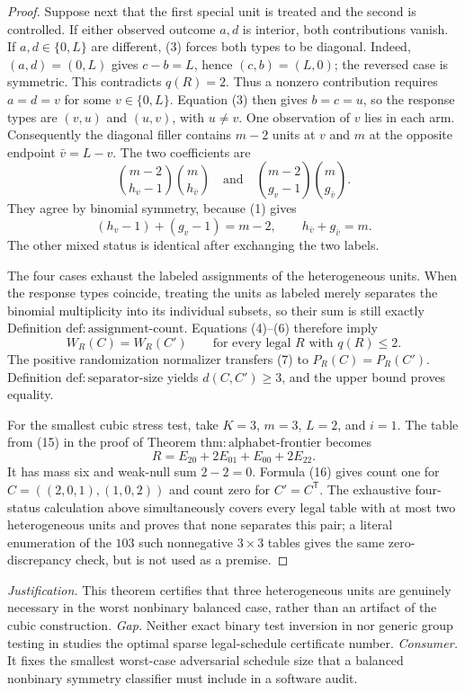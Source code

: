 \documentclass{article}
\begin{document}
\begin{proof}
Suppose next that the first special unit is treated and the second is controlled. If either observed outcome \(a,d\) is interior, both contributions vanish. If \(a,d\in\{0,L\}\) are different, (3) forces both types to be diagonal. Indeed, \((a,d)=(0,L)\) gives \(c-b=L\), hence \((c,b)=(L,0)\); the reversed case is symmetric. This contradicts \(q(R)=2\). Thus a nonzero contribution requires \(a=d=v\) for some \(v\in\{0,L\}\). Equation (3) then gives \(b=c=u\), so the response types are \((v,u)\) and \((u,v)\), with \(u\neq v\). One observation of \(v\) lies in each arm. Consequently the diagonal filler contains \(m-2\) units at \(v\) and \(m\) at the opposite endpoint \(\bar v=L-v\). The two coefficients are
\[
 \binom{m-2}{h_v-1}\binom m{h_{\bar v}}
 \quad\text{and}\quad
 \binom{m-2}{g_v-1}\binom m{g_{\bar v}}.
 \tag{6}
\]
They agree by binomial symmetry, because (1) gives
\[
 (h_v-1)+(g_v-1)=m-2,
 \qquad h_{\bar v}+g_{\bar v}=m.
\]
The other mixed status is identical after exchanging the two labels.

The four cases exhaust the labeled assignments of the heterogeneous units. When the response types coincide, treating the units as labeled merely separates the binomial multiplicity into its individual subsets, so their sum is still exactly Definition \(\mathrm{def{:}assignment\text{-}count}\). Equations (4)--(6) therefore imply
\[
 W_R(C)=W_R(C')
 \qquad\text{for every legal }R\text{ with }q(R)\leq2.
 \tag{7}
\]
The positive randomization normalizer transfers (7) to \(P_R(C)=P_R(C')\). Definition \(\mathrm{def{:}separator\text{-}size}\) yields \(d(C,C')\geq3\), and the upper bound proves equality.

For the smallest cubic stress test, take \(K=3\), \(m=3\), \(L=2\), and \(i=1\). The table from (15) in the proof of Theorem \(\mathrm{thm{:}alphabet\text{-}frontier}\) becomes
\[
 R=E_{20}+2E_{01}+E_{00}+2E_{22}.
\]
It has mass six and weak-null sum \(2-2=0\). Formula (16) gives count one for \(C=((2,0,1),(1,0,2))\) and count zero for \(C'=C^{\mathsf T}\). The exhaustive four-status calculation above simultaneously covers every legal table with at most two heterogeneous units and proves that none separates this pair; a literal enumeration of the \(103\) such nonnegative \(3\times3\) tables gives the same zero-discrepancy check, but is not used as a premise.
\end{proof}
\par\smallskip\noindent \textit{Justification.} This theorem certifies that three heterogeneous units are genuinely necessary in the worst nonbinary balanced case, rather than an artifact of the cubic construction. \textit{Gap.} Neither exact binary test inversion in \cite{RigdonHudgens2015} nor generic group testing in \cite{HemerikGoeman2018} studies the optimal sparse legal-schedule certificate number. \textit{Consumer.} It fixes the smallest worst-case adversarial schedule size that a balanced nonbinary symmetry classifier must include in a software audit.
\end{document}
